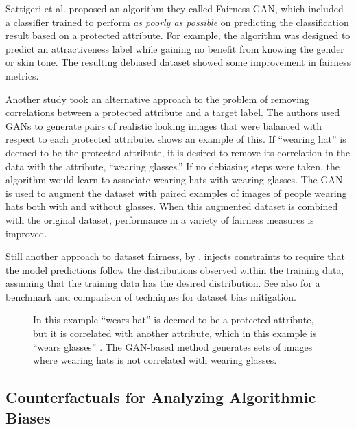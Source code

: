 Sattigeri et al. \cite{Sattigeri2019} proposed an algorithm they called Fairness GAN, which included a classifier trained to perform {\em as poorly as possible} on predicting the classification result based on a protected attribute.  For example, the algorithm was designed to predict an attractiveness label while gaining no benefit from knowing the gender or skin tone.  The resulting debiased dataset showed some improvement in fairness metrics.

Another study \cite{Ramaswamy2021}  took an alternative approach to the problem of removing correlations between a protected attribute and a target label.  The authors  used GANs to generate pairs of realistic looking images that were balanced with respect to each protected attribute.  \Fig{\ref{fig:augmentation}} shows an example of this.  If ``wearing hat'' is deemed to be the protected attribute, it is desired to remove its correlation in the data with the attribute, ``wearing glasses.'' If no debiasing steps were taken, the algorithm would learn to associate wearing hats with wearing glasses.  The GAN is used to augment the dataset with paired examples of images of people wearing hats both with and without glasses.
When this augmented dataset is combined with the original dataset, performance in a variety of fairness measures is improved.

Still another approach to dataset fairness, by \cite{Zhao2017},
injects constraints to require that the model predictions follow the
distributions observed within the
training data, assuming that the training data has the desired distribution.
See also \cite{Wang2020} for a  benchmark and comparison of techniques for dataset bias mitigation.

\begin{figure}[t]
  \centerline{
    }
  \caption{In this example ``wears hat'' is deemed to be a protected attribute, but it is correlated with another attribute, which in this example is ``wears glasses'' \cite{Ramaswamy2021}. The GAN-based method generates sets of images where wearing hats is not correlated with wearing glasses.}
  \label{fig:augmentation}
\end{figure}


\subsection{Counterfactuals for Analyzing Algorithmic Biases}

